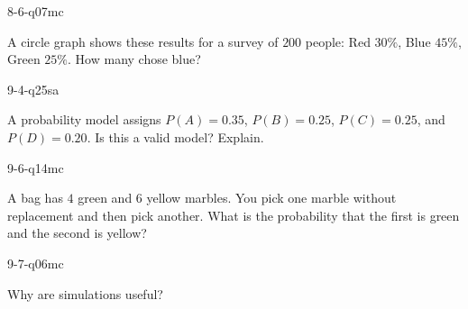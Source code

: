 \begin{practiceQuestion}{8-6-q07}{mc}
\begin{questionText}
A circle graph shows these results for a survey of $200$ people: Red $30\%$, Blue $45\%$, Green $25\%$. How many chose blue?
\end{questionText}
\end{practiceQuestion}

\begin{practiceQuestion}{9-4-q25}{sa}
\begin{questionText}
A probability model assigns $P(A) = 0.35$, $P(B) = 0.25$, $P(C) = 0.25$, and $P(D) = 0.20$. Is this a valid model? Explain.
\end{questionText}
\end{practiceQuestion}

\begin{practiceQuestion}{9-6-q14}{mc}
\begin{questionText}
A bag has $4$ green and $6$ yellow marbles. You pick one marble without replacement and then pick another. What is the probability that the first is green and the second is yellow?
\end{questionText}
\end{practiceQuestion}

\begin{practiceQuestion}{9-7-q06}{mc}
\begin{questionText}
Why are simulations useful?
\end{questionText}
\end{practiceQuestion}
